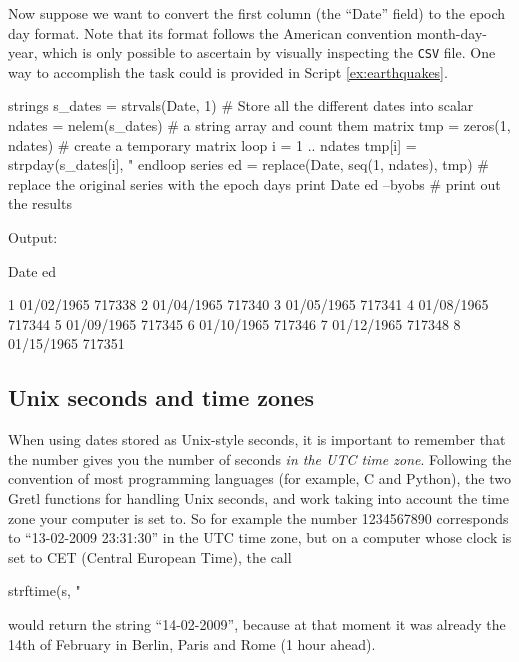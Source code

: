 Now suppose we want to convert the first column (the ``Date'' field)
to the epoch day format. Note that its format follows the American
convention month-day-year, which is only possible to ascertain by
visually inspecting the \texttt{CSV} file. One way to accomplish the
task could is provided in Script \ref{ex:earthquakes}.

\begin{script}[htbp]
  \label{ex:earthquakes}
\begin{scodebit}
strings s_dates = strvals(Date, 1)             # Store all the different dates into 
scalar ndates = nelem(s_dates)                 # a string array and count them
matrix tmp = zeros(1, ndates)                  # create a temporary matrix
loop i = 1 .. ndates
    tmp[i] = strpday(s_dates[i], "%
endloop
series ed = replace(Date, seq(1, ndates), tmp) # replace the original series with the epoch days
print Date ed --byobs                          # print out the results

\end{scodebit}
  
Output:
\begin{outbit}
                      Date           ed

1               01/02/1965       717338
2               01/04/1965       717340
3               01/05/1965       717341
4               01/08/1965       717344
5               01/09/1965       717345
6               01/10/1965       717346
7               01/12/1965       717348
8               01/15/1965       717351
\end{outbit}
\end{script}

\subsection{Unix seconds and time zones}

When using dates stored as Unix-style seconds, it is important to
remember that the number gives you the number of seconds \emph{in the
  UTC time zone}. Following the convention of most programming
languages (for example, C and Python), the two Gretl functions for
handling Unix seconds,  and  work taking
into account the time zone your computer is set to. So for example the
number 1234567890 corresponds to ``13-02-2009 23:31:30'' in the UTC
time zone, but on a computer whose clock is set to CET (Central
European Time), the call
\begin{code}
  strftime(s, "%
\end{code}
would return the string ``14-02-2009'', because at that moment it was
already the 14th of February in Berlin, Paris and Rome (1 hour ahead).

